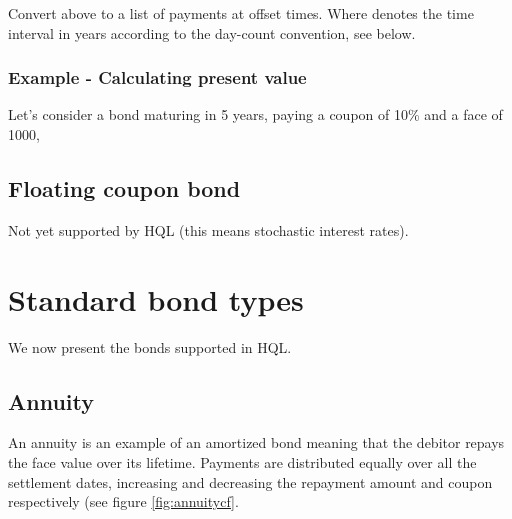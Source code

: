 \documentclass[11pt,a4paper]{article}
\numberwithin{equation}{section}
\begin{document}
Convert above to a list of payments at offset times. Where denotes the time interval in years
according to the day-count convention, see below.

\subsubsection{Example - Calculating present value}


Let's consider a bond maturing in 5 years, paying a coupon of 10\% and a face of 1000,


\subsection{Floating coupon bond}
Not yet supported by HQL (this means stochastic interest rates).

\section{Standard bond types}

We now present the bonds supported in HQL.

\subsection{Annuity}

An annuity is an example of an amortized bond meaning that the debitor repays the
face value over its lifetime. Payments are distributed equally over all the settlement
dates, increasing and decreasing the repayment amount and coupon respectively (see figure
\ref{fig:annuitycf}.
\end{document}
